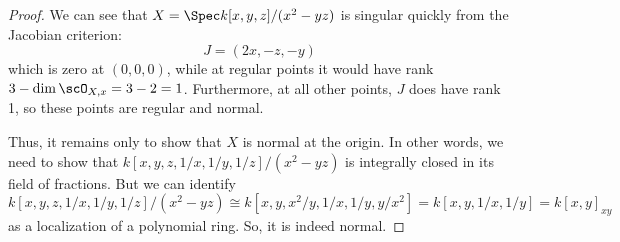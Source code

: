 \begin{proof}
	We can see that $X = \Spec k[x,y,z]/(x^2-yz)$ is singular quickly from the Jacobian criterion:
	\[ J = (2x, -z, -y) \]
	which is zero at $(0,0,0)$, while at regular points it would have rank $3-\dim\scO_{X,x} = 3-2 = 1$. Furthermore, at all other points, $J$ does have rank 1, so these points are regular and normal.
	
	Thus, it remains only to show that $X$ is normal at the origin. In other words, we need to show that $k[x,y,z,1/x,1/y,1/z]/(x^2-yz)$ is integrally closed in its field of fractions. But we can identify
	\[ k[x,y,z,1/x,1/y,1/z]/(x^2-yz) \cong k[x,y,x^2/y,1/x,1/y,y/x^2] = k[x,y,1/x,1/y] = k[x,y]_{xy} \]
	as a localization of a polynomial ring. So, it is indeed normal.
\end{proof}
